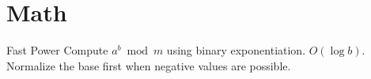 \section{Math}
\label{sec:math}

\AlgorithmEntry
  {Fast Power}
  {Compute $a^b \bmod m$ using binary exponentiation.}
  {$O(\log b)$.}
  {Normalize the base first when negative values are possible.}


